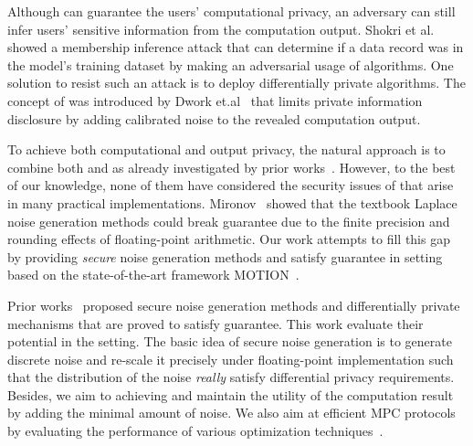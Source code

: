 Although \smpc can guarantee the users' computational privacy, an adversary can still infer users' sensitive information from the computation output. Shokri et al.~\cite{shokri2017membership} showed a membership inference attack that can determine if a data record was in the model's training dataset by making an adversarial usage of \machinelearning algorithms. One solution to resist such an attack is to deploy differentially private algorithms. The concept of \differentialprivacy was introduced by Dwork et.al~\cite{dwork2006differential, dwork2006calibrating} that limits private information disclosure by adding calibrated noise to the revealed computation output.

To achieve both computational and output privacy, the natural approach is to combine both \smpc and \differentialprivacy as already investigated by prior works~\cite{eigner2014differentially, pettai2015combining, truex2019hybrid,byrd2020differentially}. However, to the best of our knowledge, none of them have considered the security issues of \differentialprivacy that arise in many practical implementations. Mironov~\cite{mironov2012significance} showed that the textbook Laplace noise generation methods could break \differentialprivacy guarantee due to the finite precision and rounding effects of floating-point arithmetic. Our work attempts to fill this gap by providing \textit{secure} noise generation methods and satisfy \differentialprivacy guarantee in \smpc setting based on the state-of-the-art \smpc framework MOTION~\cite{braun2022motion}.

Prior works~\cite{mironov2012significance,googleDP2019,canonne2020discrete} proposed secure noise generation methods and differentially private mechanisms that are proved to satisfy \differentialprivacy guarantee.
This work evaluate their potential in the \smpc setting.
The basic idea of secure noise generation is to generate discrete noise and re-scale it precisely under floating-point implementation such that the distribution of the noise \textit{really} satisfy differential privacy requirements. Besides, we aim to achieving \differentialprivacy and maintain the utility of the computation result by adding the minimal amount of noise. We also aim at efficient MPC protocols by evaluating the performance of various \smpc optimization techniques~\cite{braun2022motion}.

